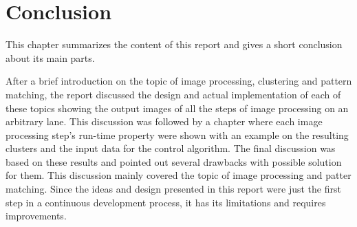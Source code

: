 \documentclass[Report.tex]{subfiles}
\begin{document}
\chapter{Conclusion}
\label{chapter:Conclusion}
This chapter summarizes the content of this report and gives a short conclusion about its main parts.

After a brief introduction on the topic of image processing, clustering and
pattern matching, the report discussed the design and actual implementation of
each of these topics showing the output images of all the steps of image
processing on an arbitrary lane. This discussion was followed by a chapter
where each image processing step's run-time property were shown with an example
on the resulting clusters and the input data for the control algorithm. The
final discussion was based on these results and pointed out several drawbacks
with possible solution for them. This discussion mainly covered the topic of
image processing and patter matching. Since the ideas and design presented in
this report were just the first step in a continuous development process, it
has its limitations and requires improvements.
\end{document}

